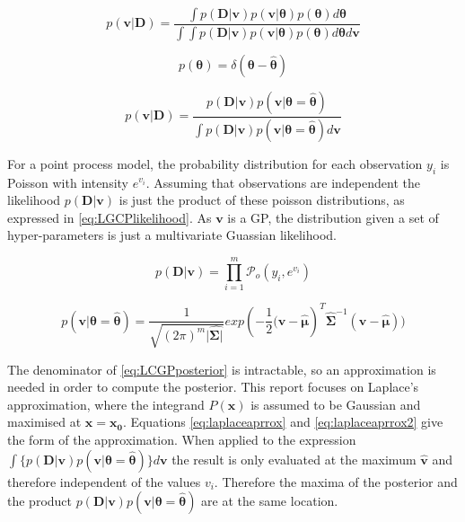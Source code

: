 \documentclass[a4paper,11pt]{report}
\begin{document}
\begin{equation} \label{eq:LCGPposterior}
p(\mathbf{v | D}) = \frac{\int{p(\mathbf{D|v})p(\mathbf{v}|\boldsymbol{\theta})p(\boldsymbol{\theta}) d\boldsymbol{\theta}}}{\int{\int{p(\mathbf{D|v})p(\mathbf{v}|\boldsymbol{\theta})p(\boldsymbol{\theta}) d\boldsymbol{\theta} d\mathbf{v}}}}
\end{equation}

\begin{equation}
p(\boldsymbol{\theta}) = \delta(\boldsymbol{\theta} - \hat{\boldsymbol{\theta}})
\end{equation}

\begin{equation} \label{eq:LCGPposterior2}
p(\mathbf{v | D}) = \frac{p(\mathbf{D|v})p(\mathbf{v}|\boldsymbol{\theta}=\hat{\boldsymbol{\theta}}) }{\int{p(\mathbf{D|v})p(\mathbf{v}|\boldsymbol{\theta}=\hat{\boldsymbol{\theta}}) d\mathbf{v}}}
\end{equation}

\doublespacing

For a point process model, the probability distribution for each observation \(y_i\) is Poisson with intensity \(e^{v_i}\). Assuming that observations are independent the likelihood \(p(\mathbf{D|v})\) is just the product of these poisson distributions, as expressed in \ref{eq:LGCPlikelihood}. As \(\mathbf{v}\) is a GP, the distribution given a set of hyper-parameters is just a multivariate Guassian likelihood. 

\singlespacing

\begin{equation} \label{eq:LGCPlikelihood}
p(\mathbf{D|v}) = \prod_{i=1}^{m} \mathcal{P}_o (y_i, e^{v_i})
\end{equation}

\begin{equation}
p(\mathbf{v}|\boldsymbol{\theta}=\hat{\boldsymbol{\theta}}) = \frac{1}{\sqrt{(2\pi)^{m} |\hat{\boldsymbol{\Sigma|}}}} exp(- \frac{1}{2} \mathbf{(v}-\hat{\boldsymbol{\mu}})^{T}\hat{\boldsymbol{\Sigma}}^{-1}(\mathbf{v}-\hat{\boldsymbol{\mu}}))
\end{equation}

\doublespacing

The denominator of \ref{eq:LCGPposterior} is intractable, so an approximation is needed in order to compute the posterior. This report focuses on Laplace's approximation, where the integrand \(P(\mathbf{x})\) is assumed to be Gaussian and maximised at \(\mathbf{x=x_0}\). Equations \ref{eq:laplaceaprrox} and \ref{eq:laplaceaprrox2} give the form of the approximation. \cite{Mackay} When applied to the expression \(\int{\{p(\mathbf{D|v}) p(\mathbf{v}|\boldsymbol{\theta}=\hat{\boldsymbol{\theta}})\} d\mathbf{v}} \) the result is only evaluated at the maximum \(\hat{\mathbf{v}}\) and therefore independent of the values \(v_i\). Therefore the maxima of the posterior and the product \(p(\mathbf{D|v}) p(\mathbf{v}|\boldsymbol{\theta}=\hat{\boldsymbol{\theta}})\) are at the same location.
\end{document}
